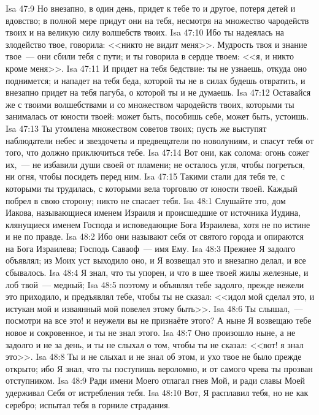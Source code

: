 \vs Isa 47:9 Но внезапно, в один день, придет к тебе то и другое, потеря детей и вдовство; в полной мере придут они на тебя, несмотря на множество чародейств твоих и на великую силу волшебств твоих.
\vs Isa 47:10 Ибо ты надеялась на злодейство твое, говорила: <<никто не видит меня>>. Мудрость твоя и знание твое~--- они сбили тебя с пути; и ты говорила в сердце твоем: <<я, и никто кроме меня>>.
\vs Isa 47:11 И придет на тебя бедствие: ты не узнаешь, откуда оно поднимется; и нападет на тебя беда, которой ты не в силах будешь отвратить, и внезапно придет на тебя пагуба, о которой ты и не думаешь.
\vs Isa 47:12 Оставайся же с твоими волшебствами и со множеством чародейств твоих, которыми ты занималась от юности твоей: может быть, пособишь себе, может быть, устоишь.
\vs Isa 47:13 Ты утомлена множеством советов твоих; пусть же выступят наблюдатели небес и звездочеты и предвещатели по новолуниям, и спасут тебя от того, что должно приключиться тебе.
\vs Isa 47:14 Вот они, как солома: огонь сожег их,~--- не избавили души своей от пламени; не осталось угля, чтобы погреться, ни огня, чтобы посидеть перед ним.
\vs Isa 47:15 Такими стали для тебя те, с которыми ты трудилась, с которыми вела торговлю от юности твоей. Каждый побрел в свою сторону; никто не спасает тебя.
\vs Isa 48:1 Слушайте это, дом Иакова, называющиеся именем Израиля и происшедшие от источника Иудина, клянущиеся именем Господа и исповедающие Бога Израилева, хотя не по истине и не по правде.
\vs Isa 48:2 Ибо они называют себя  от святого города и опираются на Бога Израилева; Господь Саваоф~--- имя Ему.
\vs Isa 48:3 Прежнее Я задолго объявлял; из Моих уст выходило оно, и Я возвещал это и внезапно делал, и все сбывалось.
\vs Isa 48:4 Я знал, что ты упорен, и что в шее твоей жилы железные, и лоб твой~--- медный;
\vs Isa 48:5 поэтому и объявлял тебе задолго, прежде нежели это приходило, и предъявлял тебе, чтобы ты не сказал: <<идол мой сделал это, и истукан мой и изваянный мой повелел этому быть>>.
\vs Isa 48:6 Ты слышал,~--- посмотри на все это! и неужели вы не признаёте этого? А ныне Я возвещаю тебе новое и сокровенное, и ты не знал этого.
\vs Isa 48:7 Оно произошло ныне, а не задолго и не за день, и ты не слыхал о том, чтобы ты не сказал: <<вот! я знал это>>.
\vs Isa 48:8 Ты и не слыхал и не знал об этом, и ухо твое не было прежде открыто; ибо Я знал, что ты поступишь вероломно, и от самого чрева  ты прозван отступником.
\vs Isa 48:9 Ради имени Моего отлагал гнев Мой, и ради славы Моей удерживал Себя от истребления тебя.
\vs Isa 48:10 Вот, Я расплавил тебя, но не как серебро; испытал тебя в горниле страдания.
